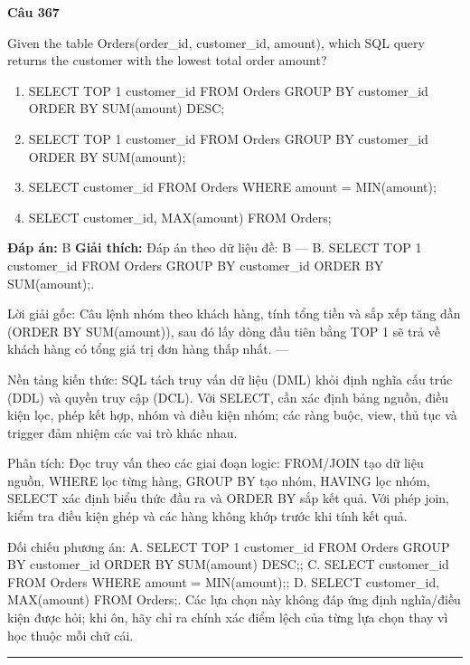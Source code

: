 \documentclass[11pt,a4paper]{article}
\newenvironment{question}[1]{%
  \par\vspace{1em}\noindent\textbf{\large Câu #1}\par\vspace{0.4em}
}{%
  \par\vspace{1em}\hrule\vspace{0.6em}
}
\newenvironment{choices}{%
  \begin{enumerate}[label=\textbf{\Alph*.},leftmargin=2.2em,itemsep=2pt,topsep=3pt]
}{%
  \end{enumerate}
}
\newcommand{\choice}{\item}
\begin{document}
\begin{question}{367}
Given the table Orders(order_id, customer_id, amount), which SQL query returns the customer with the lowest total order amount?
\begin{choices}
\choice SELECT TOP 1 customer_id FROM Orders GROUP BY customer_id ORDER BY SUM(amount) DESC;
\choice SELECT TOP 1 customer_id FROM Orders GROUP BY customer_id ORDER BY SUM(amount);
\choice SELECT customer_id FROM Orders WHERE amount = MIN(amount);
\choice SELECT customer_id, MAX(amount) FROM Orders;
\end{choices}
\textbf{Đáp án:} B
\textbf{Giải thích:} Đáp án theo dữ liệu đề: B — B. SELECT TOP 1 customer_id FROM Orders GROUP BY customer_id ORDER BY SUM(amount);.

Lời giải gốc: Câu lệnh nhóm theo khách hàng, tính tổng tiền và sắp xếp tăng dần (ORDER BY SUM(amount)), sau đó lấy dòng đầu tiên bằng TOP 1 sẽ trả về khách hàng có tổng giá trị đơn hàng thấp nhất. ---

Nền tảng kiến thức: SQL tách truy vấn dữ liệu (DML) khỏi định nghĩa cấu trúc (DDL) và quyền truy cập (DCL). Với SELECT, cần xác định bảng nguồn, điều kiện lọc, phép kết hợp, nhóm và điều kiện nhóm; các ràng buộc, view, thủ tục và trigger đảm nhiệm các vai trò khác nhau.

Phân tích: Đọc truy vấn theo các giai đoạn logic: FROM/JOIN tạo dữ liệu nguồn, WHERE lọc từng hàng, GROUP BY tạo nhóm, HAVING lọc nhóm, SELECT xác định biểu thức đầu ra và ORDER BY sắp kết quả. Với phép join, kiểm tra điều kiện ghép và các hàng không khớp trước khi tính kết quả.

Đối chiếu phương án: A. SELECT TOP 1 customer_id FROM Orders GROUP BY customer_id ORDER BY SUM(amount) DESC;; C. SELECT customer_id FROM Orders WHERE amount = MIN(amount);; D. SELECT customer_id, MAX(amount) FROM Orders;. Các lựa chọn này không đáp ứng định nghĩa/điều kiện được hỏi; khi ôn, hãy chỉ ra chính xác điểm lệch của từng lựa chọn thay vì học thuộc mỗi chữ cái.
\end{question}
\end{document}

